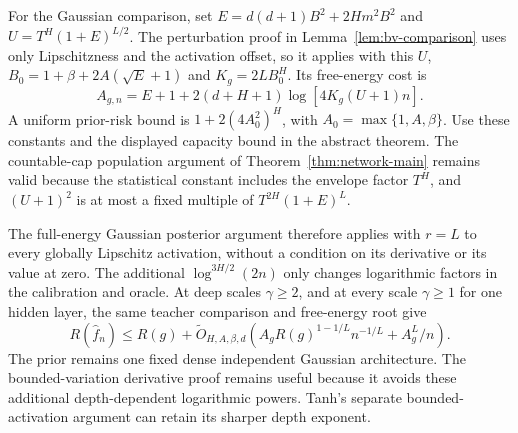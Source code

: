 For the Gaussian comparison, set $E=d(d+1)B^2+2Hm^2B^2$ and $U=T^H(1+E)^{L/2}$. The perturbation proof in Lemma~\ref{lem:bv-comparison} uses only Lipschitzness and the activation offset, so it applies with this $U$, $B_0=1+\beta+2A(\sqrt E+1)$ and $K_g=2LB_0^H$. Its free-energy cost is
\[
 A_{g,n}=E+1+2(d+H+1)\log[4K_g(U+1)n].
\]
A uniform prior-risk bound is $1+2(4A_0^2)^H$, with $A_0=\max\{1,A,\beta\}$. Use these constants and the displayed capacity bound in the abstract theorem. The countable-cap population argument of Theorem~\ref{thm:network-main} remains valid because the statistical constant includes the envelope factor $T^H$, and $(U+1)^2$ is at most a fixed multiple of $T^{2H}(1+E)^L$.

The full-energy Gaussian posterior argument therefore applies with
$r=L$ to every globally Lipschitz activation, without a condition on
its derivative or its value at zero. The additional
$\log^{3H/2}(2n)$ only changes logarithmic factors in the calibration
and oracle. At deep scales $\gamma\ge2$, and at every scale
$\gamma\ge1$ for one hidden layer, the same teacher comparison and
free-energy root give
\[
 R(\widehat f_n)\le R(g)+\widetilde O_{H,A,\beta,d}
   \left(A_g R(g)^{1-1/L}n^{-1/L}+A_g^L/n\right).
\]
The prior remains one fixed dense independent Gaussian architecture.
The bounded-variation derivative proof remains useful because it avoids
these additional depth-dependent logarithmic powers. Tanh's separate
bounded-activation argument can retain its sharper depth exponent.
